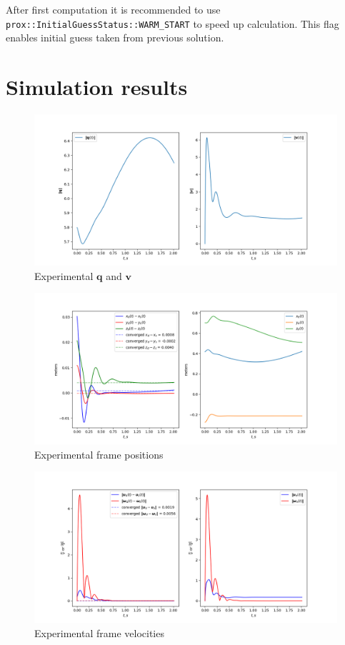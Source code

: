After first computation it is recommended to use \\
\texttt{prox::InitialGuessStatus::WARM\_START} to speed up calculation. This 
flag enables initial guess taken from previous solution.

\section{Simulation results}
\label{sec:sim_results}

\begin{figure}[H]
    \centering
    \includegraphics[scale=0.52]{figs/q_and_v_history.png}
    \caption{Experimental $\mathbf{q}$ and $\mathbf{v}$}
    \label{fig:q_and_v_plot}
\end{figure}

\begin{figure}[H]
    \centering
    \includegraphics[scale=0.52]{figs/poses_history.png}
    \caption{Experimental frame positions}
    \label{fig:poses_plot}
\end{figure}

\begin{figure}[H]
    \centering
    \includegraphics[scale=0.52]{figs/vels_history.png}
    \caption{Experimental frame velocities}
    \label{fig:vels_plot}
\end{figure}

